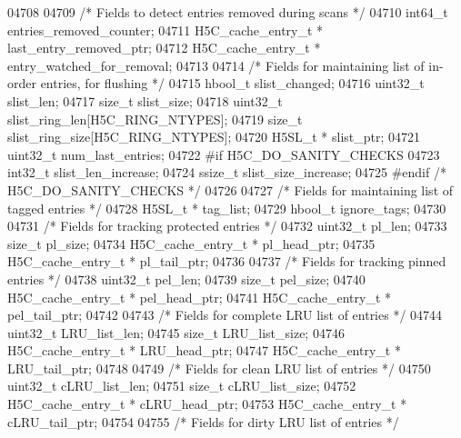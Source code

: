\begin{DoxyCode}
04708 
04709     \textcolor{comment}{/* Fields to detect entries removed during scans */}
04710     int64\_t         entries\_removed\_counter;
04711     H5C\_cache\_entry\_t *     last\_entry\_removed\_ptr;
04712     H5C\_cache\_entry\_t *     entry\_watched\_for\_removal;
04713 
04714     \textcolor{comment}{/* Fields for maintaining list of in-order entries, for flushing */}
04715     hbool\_t         slist\_changed;
04716     uint32\_t                    slist\_len;
04717     \textcolor{keywordtype}{size\_t}                      slist\_size;
04718     uint32\_t            slist\_ring\_len[H5C\_RING\_NTYPES];
04719     \textcolor{keywordtype}{size\_t}          slist\_ring\_size[H5C\_RING\_NTYPES];
04720     H5SL\_t *                    slist\_ptr;
04721     uint32\_t                    num\_last\_entries;
04722 \textcolor{preprocessor}{#if H5C\_DO\_SANITY\_CHECKS}
04723     int32\_t         slist\_len\_increase;
04724     ssize\_t         slist\_size\_increase;
04725 \textcolor{preprocessor}{#endif }\textcolor{comment}{/* H5C\_DO\_SANITY\_CHECKS */}\textcolor{preprocessor}{}
04726 
04727     \textcolor{comment}{/* Fields for maintaining list of tagged entries */}
04728     H5SL\_t *                    tag\_list;
04729     hbool\_t                     ignore\_tags;
04730 
04731     \textcolor{comment}{/* Fields for tracking protected entries */}
04732     uint32\_t                    pl\_len;
04733     \textcolor{keywordtype}{size\_t}                      pl\_size;
04734     H5C\_cache\_entry\_t *         pl\_head\_ptr;
04735     H5C\_cache\_entry\_t *     pl\_tail\_ptr;
04736 
04737     \textcolor{comment}{/* Fields for tracking pinned entries */}
04738     uint32\_t                    pel\_len;
04739     \textcolor{keywordtype}{size\_t}                      pel\_size;
04740     H5C\_cache\_entry\_t *         pel\_head\_ptr;
04741     H5C\_cache\_entry\_t *     pel\_tail\_ptr;
04742 
04743     \textcolor{comment}{/* Fields for complete LRU list of entries */}
04744     uint32\_t                    LRU\_list\_len;
04745     \textcolor{keywordtype}{size\_t}                      LRU\_list\_size;
04746     H5C\_cache\_entry\_t *     LRU\_head\_ptr;
04747     H5C\_cache\_entry\_t *     LRU\_tail\_ptr;
04748 
04749     \textcolor{comment}{/* Fields for clean LRU list of entries */}
04750     uint32\_t                    cLRU\_list\_len;
04751     \textcolor{keywordtype}{size\_t}                      cLRU\_list\_size;
04752     H5C\_cache\_entry\_t *     cLRU\_head\_ptr;
04753     H5C\_cache\_entry\_t *     cLRU\_tail\_ptr;
04754 
04755     \textcolor{comment}{/* Fields for dirty LRU list of entries */}

\end{DoxyCode}
